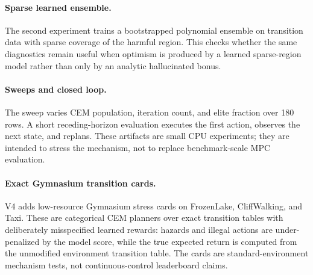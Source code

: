 \documentclass{article}
\begin{document}
\paragraph{Sparse learned ensemble.}
The second experiment trains a bootstrapped polynomial ensemble on transition data with sparse coverage of the harmful region. This checks whether the same diagnostics remain useful when optimism is produced by a learned sparse-region model rather than only by an analytic hallucinated bonus.

\paragraph{Sweeps and closed loop.}
The sweep varies CEM population, iteration count, and elite fraction over 180 rows. A short receding-horizon evaluation executes the first action, observes the next state, and replans. These artifacts are small CPU experiments; they are intended to stress the mechanism, not to replace benchmark-scale MPC evaluation.

\paragraph{Exact Gymnasium transition cards.}
V4 adds low-resource Gymnasium \citep{towers2024gymnasium} stress cards on FrozenLake, CliffWalking, and Taxi. These are categorical CEM planners over exact transition tables with deliberately misspecified learned rewards: hazards and illegal actions are under-penalized by the model score, while the true expected return is computed from the unmodified environment transition table. The cards are standard-environment mechanism tests, not continuous-control leaderboard claims.
\end{document}
